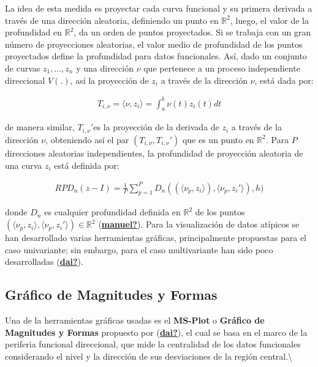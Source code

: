 \documentclass[
]{book}
\begin{document}
La idea de esta medida es proyectar cada curva funcional y su primera derivada a través de una dirección aleatoria, definiendo un punto en \(\mathbb{R}^2\), luego, el valor de la profundidad en \(\mathbb{R}^2\), da un orden de puntos proyectados. Si se trabaja con un gran número de proyecciones aleatorias, el valor medio de profundidad de los puntos proyectados define la profundidad para datos funcionales. Así, dado un conjunto de curvas \(z_1,...,z_n\) y una dirección \(\nu\) que pertenece a un proceso independiente direccional \(V(.)\), así la proyección de \(z_i\) a través de la dirección \(\nu\), está dada por:

\begin{align}
    T_{i,\nu}=\langle \nu,z_i \rangle=\int_a^b \nu(t)z_i(t)dt
\end{align}

de manera similar, \(T_{i,\nu}'\)es la proyección de la derivada de \(z_i\) a través de la dirección \(\nu\), obteniendo así el par \((T_{i,\nu},T_{i,\nu}')\) que es un punto en \(\mathbb{R}^2\). Para \(P\) direcciones aleatorias independientes, la profundidad de proyección aleatoria de una curva \(z_i\) está definida por:

\begin{align}
    RPD_n(z-I)=\frac{1}{P}\sum_{p=1}^P D_n((\langle\nu_{p},z_i \rangle),\langle\nu_p, z_{i}'\rangle), h)
\end{align}

donde \(D_n\) es cualquier profundidad definida en \(\mathbb{R}^2\) de los puntos \((\langle\nu_p,z_i \rangle,\langle\nu_p,z_i' \rangle) \in \mathbb{R}^2\) (\protect\hyperlink{ref-manuel}{\textbf{manuel?}}). Para la visualización de datos atípicos se han desarrollado varias herramientas gráficas, principalmente propuestas para el caso univariante; sin embargo, para el caso multivariante han sido poco desarrolladas (\protect\hyperlink{ref-dai}{\textbf{dai?}}).

\hypertarget{gruxe1fico-de-magnitudes-y-formas}{%
\subsection{Gráfico de Magnitudes y Formas}\label{gruxe1fico-de-magnitudes-y-formas}}

Una de la herramientas gráficas usadas es el \textbf{MS-Plot} o \textbf{Gráfico de Magnitudes y Formas} propuesto por (\protect\hyperlink{ref-dai}{\textbf{dai?}}), el cual se basa en el marco de la periferia funcional direccional, que mide la centralidad de los datos funcionales considerando el nivel y la dirección de sus desviaciones de la región central.\textbackslash{}
\end{document}
